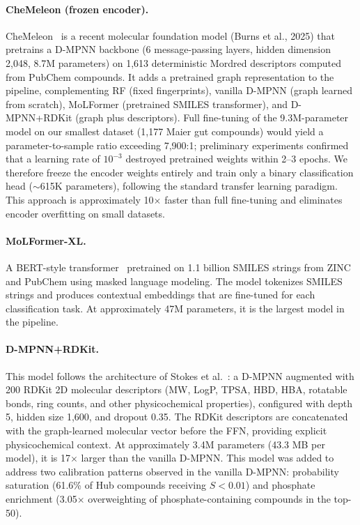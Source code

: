 \documentclass{article}
\begin{document}
\paragraph{CheMeleon (frozen encoder).}
CheMeleon~\citep{chemeleon2024} is a recent molecular foundation model (Burns et al., 2025) that pretrains a D-MPNN backbone (6 message-passing layers, hidden dimension 2,048, 8.7M parameters) on 1,613 deterministic Mordred descriptors computed from PubChem compounds.
It adds a pretrained graph representation to the pipeline, complementing RF (fixed fingerprints), vanilla D-MPNN (graph learned from scratch), MoLFormer (pretrained SMILES transformer), and D-MPNN+RDKit (graph plus descriptors).
Full fine-tuning of the 9.3M-parameter model on our smallest dataset (1,177 Maier gut compounds) would yield a parameter-to-sample ratio exceeding 7,900:1; preliminary experiments confirmed that a learning rate of $10^{-3}$ destroyed pretrained weights within 2--3 epochs.
We therefore freeze the encoder weights entirely and train only a binary classification head (${\sim}$615K parameters), following the standard transfer learning paradigm.
This approach is approximately 10$\times$ faster than full fine-tuning and eliminates encoder overfitting on small datasets.

\paragraph{MoLFormer-XL.}
A BERT-style transformer~\citep{molformer2022} pretrained on 1.1 billion SMILES strings from ZINC and PubChem using masked language modeling.
The model tokenizes SMILES strings and produces contextual embeddings that are fine-tuned for each classification task.
At approximately 47M parameters, it is the largest model in the pipeline.

\paragraph{D-MPNN+RDKit.}
This model follows the architecture of Stokes et al.~\citep{stokes2020}: a D-MPNN augmented with 200 RDKit 2D molecular descriptors (MW, LogP, TPSA, HBD, HBA, rotatable bonds, ring counts, and other physicochemical properties), configured with depth 5, hidden size 1,600, and dropout 0.35.
The RDKit descriptors are concatenated with the graph-learned molecular vector before the FFN, providing explicit physicochemical context.
At approximately 3.4M parameters (43.3 MB per model), it is 17$\times$ larger than the vanilla D-MPNN.
This model was added to address two calibration patterns observed in the vanilla D-MPNN: probability saturation (61.6\% of Hub compounds receiving $S < 0.01$) and phosphate enrichment (3.05$\times$ overweighting of phosphate-containing compounds in the top-50).
\end{document}
